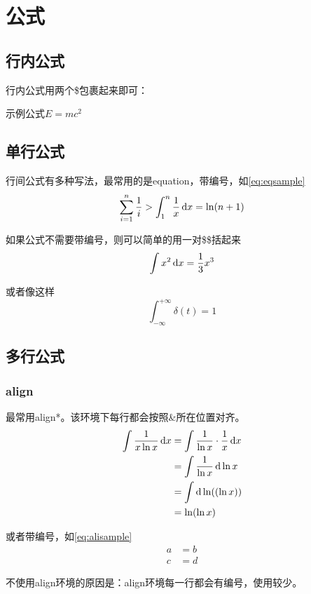 \section{公式}
\subsection{行内公式}
行内公式用两个\$包裹起来即可：

示例公式$E=mc^2$
\subsection{单行公式}
行间公式有多种写法，最常用的是equation，带编号，如\autoref{eq:eqsample}
\begin{equation}
    \sum_{i=1}^{n}\frac{1}{i}>\int_{1}^{n}\frac{1}{x}\d x=\ln(n+1)
    \label{eq:eqsample}
\end{equation}

如果公式不需要带编号，则可以简单的用一对\$\$括起来
$$
\int x^2 \d x = \frac{1}{3}x^3
$$

或者像这样
\begin{equation*}
    \int_{-\infty}^{+\infty}\delta(t)=1
\end{equation*}

\subsection{多行公式}
\subsubsection{align}
最常用align*。该环境下每行都会按照\&所在位置对齐。
\begin{align*}
    \int \frac{1}{x\ln x}\d x 
    &= \int \frac{1}{\ln x}\cdot \frac{1}{x}\d x\\
    &= \int \frac{1}{\ln x} \d \ln x\\
    &= \int  \d \ln((\ln x))\\
    &= \ln(\ln x)
\end{align*}

或者带编号，如\autoref{eq:alisample}
\begin{equation}
    \begin{aligned}
        a&=b\\
        c&=d
    \end{aligned}
    \label{eq:alisample}
\end{equation}

不使用align环境的原因是：align环境每一行都会有编号，使用较少。

